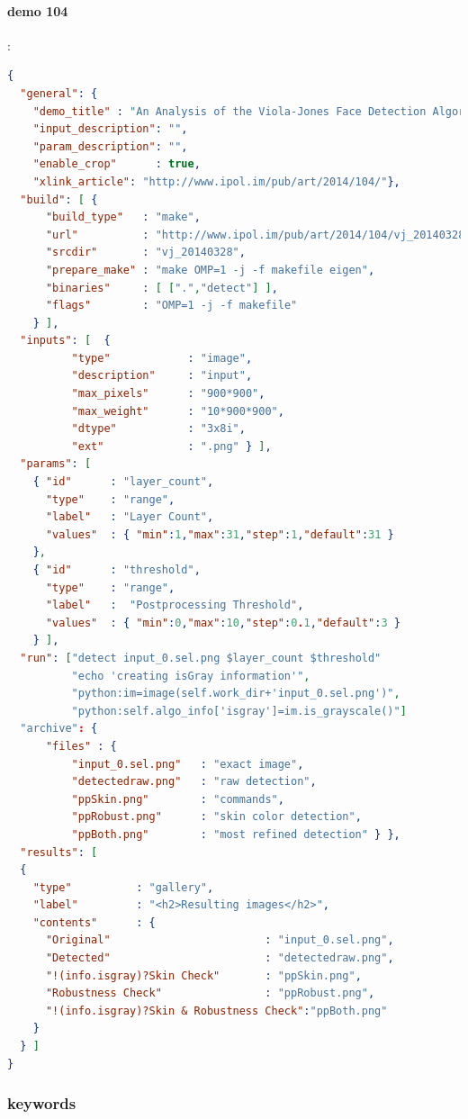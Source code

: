 \paragraph{demo 104}: \\
\begin{lstlisting}[language=json,firstnumber=1]
{ 
  "general": { 
    "demo_title" : "An Analysis of the Viola-Jones Face Detection Algorithm",
    "input_description": "",
    "param_description": "",
    "enable_crop"      : true,
    "xlink_article": "http://www.ipol.im/pub/art/2014/104/"}, 
  "build": [ {
      "build_type"   : "make",
      "url"          : "http://www.ipol.im/pub/art/2014/104/vj_20140328.tar.gz", 
      "srcdir"       : "vj_20140328",
      "prepare_make" : "make OMP=1 -j -f makefile eigen",
      "binaries"     : [ [".","detect"] ],
      "flags"        : "OMP=1 -j -f makefile"
    } ],
  "inputs": [  {
          "type"            : "image", 
          "description"     : "input",
          "max_pixels"      : "900*900",
          "max_weight"      : "10*900*900",
          "dtype"           : "3x8i",
          "ext"             : ".png" } ],
  "params": [ 
    { "id"      : "layer_count",
      "type"    : "range", 
      "label"   : "Layer Count",
      "values"  : { "min":1,"max":31,"step":1,"default":31 }
    },
    { "id"      : "threshold",
      "type"    : "range",
      "label"   :  "Postprocessing Threshold",
      "values"  : { "min":0,"max":10,"step":0.1,"default":3 }
    } ],
  "run": ["detect input_0.sel.png $layer_count $threshold"
          "echo 'creating isGray information'",
          "python:im=image(self.work_dir+'input_0.sel.png')",
          "python:self.algo_info['isgray']=im.is_grayscale()"]
  "archive": {
      "files" : { 
          "input_0.sel.png"   : "exact image",
          "detectedraw.png"   : "raw detection",
          "ppSkin.png"        : "commands",
          "ppRobust.png"      : "skin color detection",
          "ppBoth.png"        : "most refined detection" } },
  "results": [
  {
    "type"          : "gallery",
    "label"         : "<h2>Resulting images</h2>",
    "contents"      : { 
      "Original"                        : "input_0.sel.png", 
      "Detected"                        : "detectedraw.png",
      "!(info.isgray)?Skin Check"       : "ppSkin.png",
      "Robustness Check"                : "ppRobust.png",
      "!(info.isgray)?Skin & Robustness Check":"ppBoth.png"
    }
  } ]
}
\end{lstlisting}

\subsubsection{keywords}

